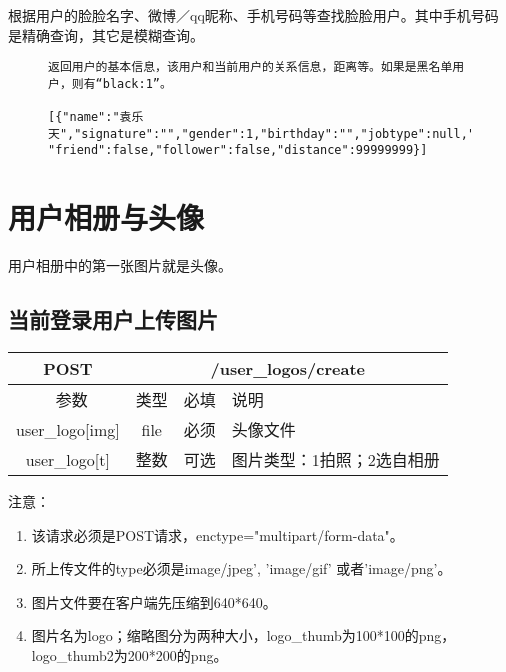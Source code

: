 根据用户的脸脸名字、微博／qq昵称、手机号码等查找脸脸用户。其中手机号码是精确查询，其它是模糊查询。


\begin{figure}[H]
\begin{verbatim}
返回用户的基本信息，该用户和当前用户的关系信息，距离等。如果是黑名单用户，则有“black:1”。

[{"name":"袁乐天","signature":"","gender":1,"birthday":"","jobtype":null,"pcount":0,"wb_uid":"a1","id":"502e6303421aa918ba00007c","logo":"","logo_thumb":"","logo_thumb2":"","wb_name":null,"qq_name":null,
"friend":false,"follower":false,"distance":99999999}]
\end{verbatim}
\end{figure}



\section{用户相册与头像}
用户相册中的第一张图片就是头像。

\subsection{当前登录用户上传图片}

\begin{table}[H]
   \begin{center}
\begin{tabular}{|c|c|c|p{12cm}|}
\hline
POST & \multicolumn{3}{|c|}{/user\_logos/create} \\
\hline\hline
 \  参数  & 类型 & 必填 &  说明  \\
\hline
 user\_logo[img]  & file & 必须 &  头像文件\\
 \hline
 user\_logo[t]  & 整数 & 可选 &  图片类型：1拍照；2选自相册\\
\hline
\end{tabular}
   \end{center}
\end{table}

注意：

\begin{enumerate}
\item 该请求必须是POST请求，enctype="multipart/form-data"。
\item 所上传文件的type必须是image/jpeg', 'image/gif' 或者'image/png'。
\item 图片文件要在客户端先压缩到640*640。
\item 图片名为logo；缩略图分为两种大小，logo\_thumb为100*100的png，logo\_thumb2为200*200的png。
\end{enumerate}

